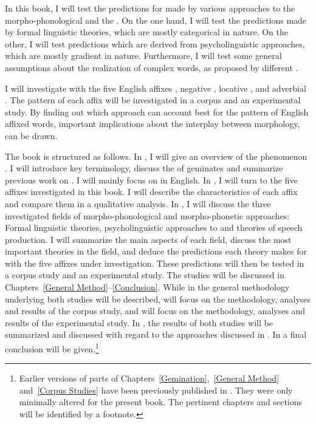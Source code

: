 In this book, I will test the predictions for  made by various approaches to the morpho-phonological and the . 
On the one hand, I will test the predictions made by formal linguistic theories, which are mostly categorical in nature. On the other, I will test predictions which are derived from psycholinguistic approaches, which are mostly gradient in nature. Furthermore, I will test some general assumptions about the realization of complex words, as proposed by different .

I will investigate  with the five English affixes , negative , locative ,  and adverbial . The  pattern of each affix will be investigated in a corpus and an experimental study. 
By finding out which approach can account best for the  pattern of English affixed words, important implications about the interplay between morphology,  can be drawn.



The book is structured as follows.
 In , I will give an overview of the phenomenon . I will introduce key terminology, discuss the  of {geminates} and summarize previous work on . I will mainly focus on  in English. 
 In , I will turn to the five affixes investigated in this book. I will describe the characteristics of each affix and compare them in a qualitative analysis. 
  In  , I will discuss the three investigated fields of morpho-phonological and morpho-phonetic approaches: Formal linguistic theories, psycholinguistic approaches to  and theories of speech production. I will summarize the main aspects of each field, discuss the most important theories in the field, and deduce the predictions each theory makes for  with the five affixes under investigation. 
  These predictions will then be tested in a corpus study and an experimental study. The studies will be discussed in Chapters~\ref{General Method}--\ref{Conclusion}.
   While in  the general methodology underlying both studies will be described, 
   will focus on the methodology, analyses and results of the corpus study, and 
   will focus on the methodology, analyses and results of the experimental study.
   In , the results of both studies will be summarized and discussed with regard to the approaches discussed in .
  In  a final conclusion will be given.\footnote{Earlier versions of parts of Chapters~\ref{Gemination},~\ref{General Method} and~\ref{Corpus Studies} have been previously published in \cite{BenHedia.2017}. They were only minimally altered for the present book. The pertinent chapters and sections will be identified by a footnote.}
